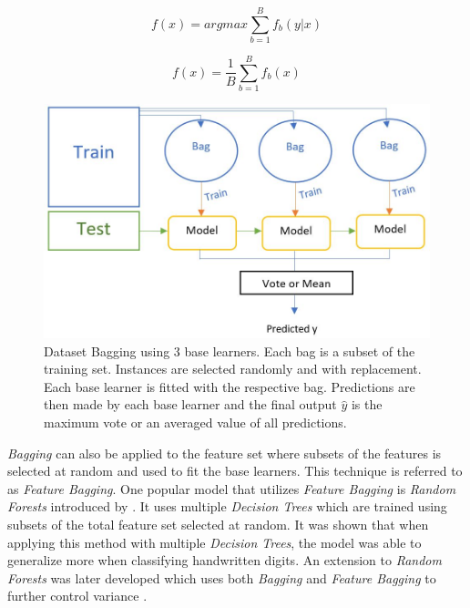 \begin{equation}\label{eq:baggingvote}
    f(x) = argmax \sum_{b=1}^{B} f_b(y | x)
\end{equation}

\begin{equation}\label{eq:baggingmean}
    f(x) = \frac{1}{B} \sum_{b=1}^{B} f_b(x)
\end{equation}

\begin{figure}
  \includegraphics{graphics/ensemble_methods/bagging_example.JPG}
  \caption{
    Dataset Bagging using 3 base learners. Each bag is a subset of the training set. Instances are selected randomly and with replacement. Each base learner is fitted with the respective bag. Predictions are then made by each base learner and the final output $\hat{y}$ is the maximum vote or an averaged value of all predictions. 
  }
  \label{fig:baggingexample}
\end{figure}

\textit{Bagging} can also be applied to the feature set where subsets of the features is selected at random and used to fit the base learners. This technique is referred to as \textit{Feature Bagging}. One popular model that utilizes \textit{Feature Bagging} is \textit{Random Forests} introduced by \citet{ho1995random}. It uses multiple \textit{Decision Trees} which are trained using subsets of the total feature set selected at random. It was shown that when applying this method with multiple \textit{Decision Trees}, the model was able to generalize more when classifying handwritten digits. An extension to \textit{Random Forests} was later developed which uses both \textit{Bagging} and \textit{Feature Bagging} to further control variance \citep{breiman2001random}.

